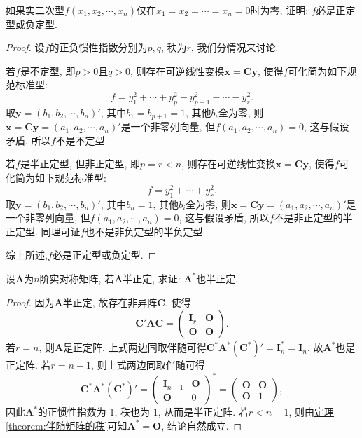 \documentclass[../../main.tex]{subfiles}%
\begin{document}
\begin{proposition}\label{proposition:实二次型只在原点处为零必是正定或负定型}
如果实二次型$f(x_1, x_2, \cdots, x_n)$仅在$x_1 = x_2 = \cdots = x_n = 0$时为零, 证明: $f$必是正定型或负定型.
\end{proposition}
\begin{proof}
设$f$的正负惯性指数分别为$p,q$, 秩为$r$, 我们分情况来讨论.

若$f$是不定型, 即$p > 0$且$q > 0$, 则存在可逆线性变换$\boldsymbol{x}=\boldsymbol{C}\boldsymbol{y}$, 使得$f$可化简为如下规范标准型:
\[
f = y_1^2 + \cdots + y_p^2 - y_{p + 1}^2 - \cdots - y_r^2.
\]
取$\boldsymbol{y}=(b_1, b_2, \cdots, b_n)'$, 其中$b_1 = b_{p + 1} = 1$, 其他$b_i$全为零, 则$\boldsymbol{x}=\boldsymbol{C}\boldsymbol{y}=(a_1, a_2, \cdots, a_n)'$是一个非零列向量, 但$f(a_1, a_2, \cdots, a_n) = 0$, 这与假设矛盾, 所以$f$不是不定型.

若$f$是半正定型, 但非正定型, 即$p = r < n$, 则存在可逆线性变换$\boldsymbol{x}=\boldsymbol{C}\boldsymbol{y}$, 使得$f$可化简为如下规范标准型:
\[
f = y_1^2 + \cdots + y_r^2.
\]
取$\boldsymbol{y}=(b_1, b_2, \cdots, b_n)'$, 其中$b_n = 1$, 其他$b_i$全为零, 则$\boldsymbol{x}=\boldsymbol{C}\boldsymbol{y}=(a_1, a_2, \cdots, a_n)'$是一个非零列向量, 但$f(a_1, a_2, \cdots, a_n) = 0$, 这与假设矛盾, 所以$f$不是非正定型的半正定型. 同理可证$f$也不是非负定型的半负定型.

综上所述,$f$必是正定型或负定型. 
\end{proof}

\begin{proposition}\label{proposition:半正定阵的伴随也半正定}
设$\boldsymbol{A}$为$n$阶实对称矩阵, 若$\boldsymbol{A}$半正定, 求证: $\boldsymbol{A}^*$也半正定.
\end{proposition}
\begin{proof}
因为$\boldsymbol{A}$半正定, 故存在非异阵$\boldsymbol{C}$, 使得
\[
\boldsymbol{C}'\boldsymbol{A}\boldsymbol{C}=\begin{pmatrix}
\boldsymbol{I}_r & \boldsymbol{O} \\
\boldsymbol{O} & \boldsymbol{O}
\end{pmatrix}.
\]
若$r = n$, 则$\boldsymbol{A}$是正定阵, 上式两边同取伴随可得$\boldsymbol{C}^*\boldsymbol{A}^*(\boldsymbol{C}^*)'=\boldsymbol{I}_n^* = \boldsymbol{I}_n$, 故$\boldsymbol{A}^*$也是正定阵. 若$r = n - 1$, 则上式两边同取伴随可得
\[
\boldsymbol{C}^*\boldsymbol{A}^*(\boldsymbol{C}^*)'=\begin{pmatrix}
\boldsymbol{I}_{n - 1} & \boldsymbol{O} \\
\boldsymbol{O} & 0
\end{pmatrix}^*=\begin{pmatrix}
\boldsymbol{O} & \boldsymbol{O} \\
\boldsymbol{O} & 1
\end{pmatrix},
\]
因此$\boldsymbol{A}^*$的正惯性指数为 1, 秩也为 1, 从而是半正定阵. 若$r < n - 1$, 则由\hyperref[theorem:伴随矩阵的秩]{定理\ref{theorem:伴随矩阵的秩}}可知$\boldsymbol{A}^*=\boldsymbol{O}$, 结论自然成立.
\end{proof}
\end{document}

